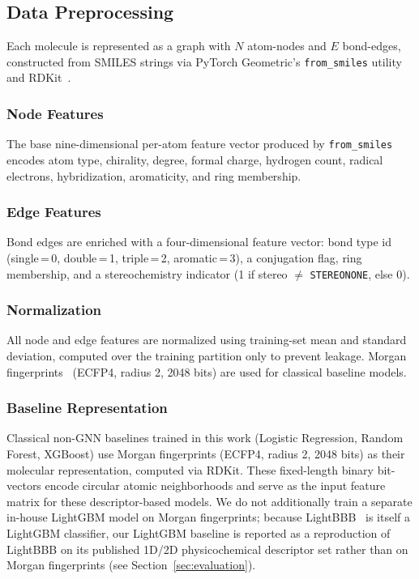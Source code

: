 \documentclass[conference]{IEEEtran}
\begin{document}
\subsection{Data Preprocessing}

Each molecule is represented as a graph with $N$ atom-nodes and $E$
bond-edges, constructed from SMILES strings via PyTorch Geometric's
\texttt{from\_smiles} utility~\cite{fey2019pytorch} and
RDKit~\cite{rdkit}.

\subsubsection{Node Features}
The base nine-dimensional per-atom feature vector produced by
\texttt{from\_smiles} encodes atom type, chirality, degree, formal
charge, hydrogen count, radical electrons, hybridization, aromaticity,
and ring membership.

\subsubsection{Edge Features}
Bond edges are enriched with a four-dimensional feature vector:
bond type id (single\,=\,0, double\,=\,1, triple\,=\,2,
aromatic\,=\,3), a conjugation flag, ring membership, and a
stereochemistry indicator (1 if stereo $\neq$ \texttt{STEREONONE},
else 0).

\subsubsection{Normalization}
All node and edge features are normalized using training-set
mean and standard deviation, computed over the training partition
only to prevent leakage. Morgan fingerprints~\cite{rogers2010ecfp}
(ECFP4, radius 2, 2048 bits) are used for classical baseline models.

\subsubsection{Baseline Representation}
Classical non-GNN baselines trained in this work (Logistic Regression,
Random Forest, XGBoost) use Morgan fingerprints (ECFP4, radius 2, 2048
bits) as their molecular representation, computed via RDKit. These
fixed-length binary bit-vectors encode circular atomic neighborhoods
and serve as the input feature matrix for these descriptor-based
models. We do not additionally train a separate in-house LightGBM
model on Morgan fingerprints; because LightBBB~\cite{Shaker2021} is
itself a LightGBM classifier, our LightGBM baseline is reported as a
reproduction of LightBBB on its published 1D/2D physicochemical
descriptor set rather than on Morgan fingerprints (see
Section~\ref{sec:evaluation}).
\end{document}

